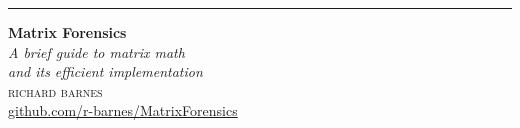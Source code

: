 \begin{titlepage} %
  \raggedleft %
  
  \rule{1pt}{\textheight} %
  \hspace{0.05\textwidth} %
  \parbox[b]{0.75\textwidth}{ %
    
    {\Huge\bfseries Matrix Forensics \\[\baselineskip]} %
    {\large\textit{A brief guide to matrix math \\ and its efficient implementation}}\\[4\baselineskip] %
    {\Large\textsc{richard barnes}} %
    \\[4\baselineskip]
    \href{https://github.com/r-barnes/MatrixForensics}{github.com/r-barnes/MatrixForensics}
    
    \vspace{0.6\textheight} %
    
  }

\end{titlepage}